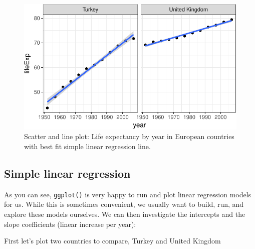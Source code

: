 \documentclass[12pt,]{krantz}
\makeatletter
\newenvironment{Shaded}{\begin{snugshade}}{\end{snugshade}}
\newcommand{\DataTypeTok}[1]{\textcolor[rgb]{0.13,0.29,0.53}{#1}}
\newcommand{\KeywordTok}[1]{\textcolor[rgb]{0.13,0.29,0.53}{\textbf{#1}}}
\newcommand{\NormalTok}[1]{#1}
\newcommand{\OperatorTok}[1]{\textcolor[rgb]{0.81,0.36,0.00}{\textbf{#1}}}
\newcommand{\StringTok}[1]{\textcolor[rgb]{0.31,0.60,0.02}{#1}}
\newenvironment{kframe}{%
\medskip{}
\setlength{\fboxsep}{.8em}
 \def\at@end@of@kframe{}%
 \ifinner\ifhmode%
  \def\at@end@of@kframe{\end{minipage}}%
  \begin{minipage}{\columnwidth}%
 \fi\fi%
 \def\FrameCommand##1{\hskip\@totalleftmargin \hskip-\fboxsep
 \colorbox{shadecolor}{##1}\hskip-\fboxsep
     \hskip-\linewidth \hskip-\@totalleftmargin \hskip\columnwidth}%
 \MakeFramed {\advance\hsize-\width
   \@totalleftmargin\z@ \linewidth\hsize
   \@setminipage}}%
 {\par\unskip\endMakeFramed%
 \at@end@of@kframe}
\renewenvironment{Shaded}{\begin{kframe}}{\end{kframe}}
\theoremstyle{definition}
\theoremstyle{definition}
\theoremstyle{definition}
\theoremstyle{remark}
\makeatother
\begin{document}
\begin{figure}
\centering
\includegraphics{07_linear_regression_files/figure-latex/unnamed-chunk-4-1.pdf}
\caption{\label{fig:unnamed-chunk-4}Scatter and line plot: Life expectancy
by year in European countries with best fit simple linear regression
line.}
\end{figure}

\hypertarget{simple-linear-regression}{%
\subsection{Simple linear regression}\label{simple-linear-regression}}

As you can see, \texttt{ggplot()} is very happy to run and plot linear
regression models for us. While this is sometimes convenient, we usually
want to build, run, and explore these models ourselves. We can then
investigate the intercepts and the slope coefficients (linear increase
per year):

First let's plot two countries to compare, Turkey and United Kingdom

\begin{Shaded}
\end{Shaded}
\end{document}
